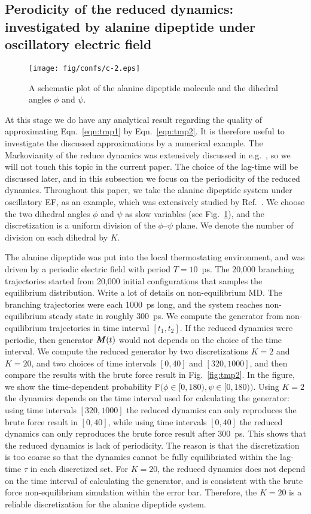 \documentclass[aps, pre, preprint,unsortedaddress,a4paper,onecolumn]{revtex4}
\newcommand{\redc}[1]{{\color{red} #1}}
\newcommand{\vect}[1]{\textbf{\textit{#1}}}
\begin{document}
\subsection{Perodicity of the reduced dynamics: investigated by alanine dipeptide under oscillatory electric field}
\begin{figure}
  \centering
  \texttt{[image: fig/confs/c-2.eps]}
  \caption{A schematic plot of the alanine dipeptide molecule and the dihedral angles $\phi$ and $\psi$.}
  \label{fig:tmp1}
\end{figure}

At this stage we do have any analytical result regarding the quality
of approximating Eqn.~\eqref{eqn:tmp1} by
Eqn.~\eqref{eqn:tmp2}.
It is therefore useful to investigate the discussed approximations
by a numerical example. The Markovianity of the reduce dynamics
was extensively discussed in e.g.~\cite{prinz2011markov}, so we 
will not touch this topic in the current paper. The choice of the lag-time
will be discussed later, and in this subsection we focus on the periodicity
of the reduced dynamics.
Throughout this paper, we take the alanine dipeptide system
under oscillatory EF, as an example, which was extensively studied by
Ref.~\cite{wang2014exploring}.
We choose the two dihedral angles $\phi$
and $\psi$ as slow variables (see Fig.~\ref{fig:tmp1}), and the discretization
is a uniform division of the $\phi$--$\psi$ plane. We denote the number of
division on each dihedral by $K$.

The alanine dipeptide was put into the local thermostating
environment, and was driven by a periodic electric field with period
$T = 10$~ps. The 20,000 branching trajectories started from 20,000
initial configurations that samples the equilibrium distribution.
\redc{Write a lot of details on non-equilibrium MD.}  The branching
trajectories were each 1000~ps long, and the system reaches
non-equilibrium steady state in roughly 300~ps. We compute the
generator from non-equilibrium trajectories in time interval $[t_1,
t_2]$. If the reduced dynamics were periodic, then generator $\vect
M(t)$ would not depends on the choice of the time interval. We compute
the reduced generator by two discretizations $K=2$ and $K=20$, and two
choices of time intervals $[0, 40]$ and $[320, 1000]$, and then
compare the results with the brute force result in
Fig.~\ref{fig:tmp2}. In the figure, we show the time-dependent
probability $\mathbb P\big(\phi\in[0,180), \psi\in [0,180)\big)$.
Using $K=2$ the dynamics depends on the time interval used for
calculating the generator: using time intervals $[320, 1000]$ the reduced
dynamics can only reproduces the brute force result in $[0, 40]$,
while using time intervals $[0, 40]$ the reduced dynamics can only
reproduces the brute force result after 300~ps.  This shows that the
reduced dynamics is lack of periodicity.  The reason is that the
discretization is too coarse so that the dynamics cannot be fully
equilibriated within the lag-time $\tau$ in each discretized set.  For
$K=20$, the reduced dynamics does not depend on the time interval of
calculating the generator, and is consistent with the brute force
non-equilibrium simulation within the error bar. Therefore, the $K=20$
is a reliable discretization for the alanine dipeptide system.
\end{document}
